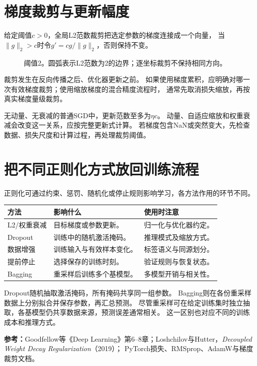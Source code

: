 \section{梯度裁剪与更新幅度}
\label{sec:numeric-clipping}
给定阈值$c>0$，全局L2范数裁剪把选定参数的梯度连接成一个向量，
当$\lVert g\rVert_2>c$时令$g'=cg/\lVert g\rVert_2$，否则保持不变。

\begin{figure}[htbp]
\centering
\caption{阈值2。圆弧表示L2范数为2的边界；逐坐标裁剪不保持相同方向。}
\par\smallskip
{}
\end{figure}

裁剪发生在反向传播之后、优化器更新之前。
如果使用梯度累积，应明确对哪一次有效梯度裁剪；使用缩放梯度的混合精度流程时，
通常先取消损失缩放，再按真实梯度量级裁剪。

\begin{pitfall}[裁剪后的梯度还要经过优化器]
无动量、无衰减的普通SGD中，更新范数至多为$\eta c$。
动量、自适应缩放和权重衰减会改变这一关系，应按完整更新式计算。
若梯度包含NaN或突然变大，先检查数据、损失尺度和计算过程，再处理裁剪阈值。
\end{pitfall}

\section{把不同正则化方式放回训练流程}
\label{sec:numeric-regularization}
正则化可通过约束、惩罚、随机化或停止规则影响学习，各方法作用的环节不同。

\begin{center}
\begin{tabularx}{\textwidth}{P{27mm}P{58mm}Y}
\toprule
方法 & 影响什么 & 使用时注意\\
\midrule
L2/权重衰减 & 目标梯度或参数更新。 & 归一化与优化器约定。\\
Dropout & 训练中的随机激活掩码。 & 推理模式及缩放方式。\\
数据增强 & 训练输入与有效样本变化。 & 标签语义与同源划分。\\
提前停止 & 选择保存的训练时刻。 & 验证规则与恢复状态。\\
Bagging & 重采样后训练多个基模型。 & 多模型开销与相关性。\\
\bottomrule
\end{tabularx}
\end{center}

Dropout随机抽取激活掩码，所有掩码共享同一组参数。
Bagging则在各份重采样数据上分别拟合并保存参数，再汇总预测。
尽管重采样可在给定训练集时独立抽取，各基模型仍共享数据来源，预测误差通常相关。
这一区别也对应不同的训练成本和推理方式。


\begingroup\small
\noindent\textbf{参考：}Goodfellow等《Deep Learning》第6--8章；Loshchilov与Hutter，\textit{Decoupled Weight Decay Regularization}（2019）；
PyTorch损失、RMSprop、AdamW与梯度裁剪文档。
\par\endgroup
